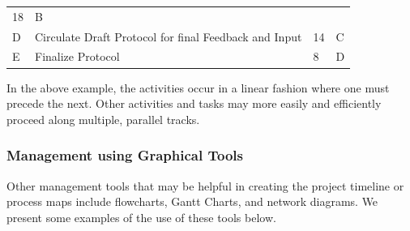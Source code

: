 \documentclass[]{book}
\theoremstyle{definition}
\theoremstyle{definition}
\theoremstyle{definition}
\theoremstyle{remark}
\begin{document}
\begin{longtable}[]{@{}llll@{}}
\begin{minipage}[t]{0.22\columnwidth}
18\strut
\end{minipage} & \begin{minipage}[t]{0.17\columnwidth}\raggedright\strut
B\strut
\end{minipage}\tabularnewline
\begin{minipage}[t]{0.20\columnwidth}\raggedright\strut
D\strut
\end{minipage} & \begin{minipage}[t]{0.30\columnwidth}\raggedright\strut
Circulate Draft Protocol for final Feedback and Input\strut
\end{minipage} & \begin{minipage}[t]{0.22\columnwidth}\raggedright\strut
14\strut
\end{minipage} & \begin{minipage}[t]{0.17\columnwidth}\raggedright\strut
C\strut
\end{minipage}\tabularnewline
\begin{minipage}[t]{0.20\columnwidth}\raggedright\strut
E\strut
\end{minipage} & \begin{minipage}[t]{0.30\columnwidth}\raggedright\strut
Finalize Protocol\strut
\end{minipage} & \begin{minipage}[t]{0.22\columnwidth}\raggedright\strut
8\strut
\end{minipage} & \begin{minipage}[t]{0.17\columnwidth}\raggedright\strut
D\strut
\end{minipage}\tabularnewline
\bottomrule
\end{longtable}

In the above example, the activities occur in a linear fashion where one
must precede the next. Other activities and tasks may more easily and
efficiently proceed along multiple, parallel tracks.

\subsubsection{Management using Graphical
Tools}\label{management-using-graphical-tools}

Other management tools that may be helpful in creating the project
timeline or process maps include flowcharts, Gantt Charts, and network
diagrams. We present some examples of the use of these tools below.
\end{document}
